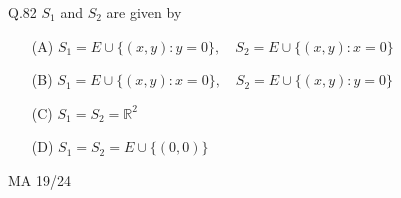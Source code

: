 \documentclass{article}
\begin{document}
																																																																																																																												      Q.82 \quad $S_1$ and $S_2$ are given by  
																																																																																																																												      \begin{itemize}
																																																																																																																												          \item[(A)] $S_1 = E \cup \{(x, y): y = 0\},\quad S_2 = E \cup \{(x, y): x = 0\}$
																																																																																																																													      \item[(B)] $S_1 = E \cup \{(x, y): x = 0\},\quad S_2 = E \cup \{(x, y): y = 0\}$
																																																																																																																													          \item[(C)] $S_1 = S_2 = \mathbb{R}^2$
																																																																																																																														      \item[(D)] $S_1 = S_2 = E \cup \{(0, 0)\}$
																																																																																																																														      \end{itemize}
																																																																																																																														      \vspace{15em}
																																																																																																																														      \begin{center}
																																																																																																																														          {MA 19/24}
																																																																																																																															  \end{center}
																																																																																																																															  \newpage
\end{document}
